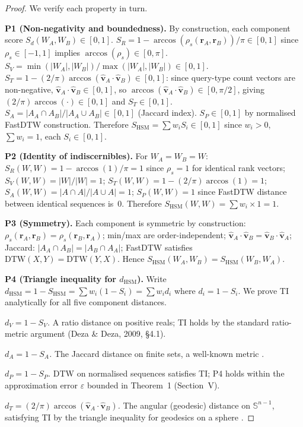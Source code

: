 \documentclass[10pt,twocolumn,a4paper]{article}
\newcommand{\SHSM}{S_{\mathrm{HSM}}}
\newcommand{\SR}{S_{R}}
\newcommand{\SV}{S_{V}}
\newcommand{\ST}{S_{T}}
\newcommand{\SA}{S_{A}}
\newcommand{\SPER}{S_{P}}
\newcommand{\dHSM}{d_{\mathrm{HSM}}}
\begin{document}
\begin{proof}
We verify each property in turn.

\textbf{P1 (Non-negativity and boundedness).}
By construction, each component score $S_d(W_A,W_B)\in[0,1]$.
$\SR=1-\arccos(\rho_s(\mathbf{r}_A,\mathbf{r}_B))/\pi\in[0,1]$
since $\rho_s\in[-1,1]$ implies $\arccos(\rho_s)\in[0,\pi]$.
$\SV=\min(|W_A|,|W_B|)/\max(|W_A|,|W_B|)\in[0,1]$.
$\ST=1-(2/\pi)\arccos(\hat{\mathbf{v}}_A\cdot\hat{\mathbf{v}}_B)\in[0,1]$:
since query-type count vectors are non-negative,
$\hat{\mathbf{v}}_A\cdot\hat{\mathbf{v}}_B\in[0,1]$, so
$\arccos(\hat{\mathbf{v}}_A\cdot\hat{\mathbf{v}}_B)\in[0,\pi/2]$,
giving $(2/\pi)\arccos(\cdot)\in[0,1]$ and $\ST\in[0,1]$.
$\SA=|A_A\cap A_B|/|A_A\cup A_B|\in[0,1]$ (Jaccard index).
$\SPER\in[0,1]$ by normalised FastDTW construction. Therefore
$\SHSM=\sum w_i S_i\in[0,1]$ since $w_i>0$, $\sum w_i=1$, each
$S_i\in[0,1]$.

\textbf{P2 (Identity of indiscernibles).}
For $W_A=W_B=W$: $\SR(W,W)=1-\arccos(1)/\pi=1$ since $\rho_s=1$ for
identical rank vectors; $\SV(W,W)=|W|/|W|=1$;
$\ST(W,W)=1-(2/\pi)\arccos(1)=1$;
$\SA(W,W)=|A\cap A|/|A\cup A|=1$;
$\SPER(W,W)=1$ since FastDTW distance between identical sequences is~0.
Therefore $\SHSM(W,W)=\sum w_i\times1=1$.

\textbf{P3 (Symmetry).}
Each component is symmetric by construction:
$\rho_s(\mathbf{r}_A,\mathbf{r}_B)=\rho_s(\mathbf{r}_B,\mathbf{r}_A)$;
min/max are order-independent;
$\hat{\mathbf{v}}_A\cdot\hat{\mathbf{v}}_B=\hat{\mathbf{v}}_B\cdot\hat{\mathbf{v}}_A$;
Jaccard: $|A_A\cap A_B|=|A_B\cap A_A|$;
FastDTW satisfies $\mathrm{DTW}(X,Y)=\mathrm{DTW}(Y,X)$.
Hence $\SHSM(W_A,W_B)=\SHSM(W_B,W_A)$.

\textbf{P4 (Triangle inequality for $\dHSM$).}
Write $\dHSM=1-\SHSM=\sum w_i(1-S_i)=\sum w_i d_i$ where $d_i=1-S_i$.
We prove TI analytically for all five component distances.

\emph{$d_V = 1-\SV$.} A ratio distance on positive reals; TI holds by
the standard ratio-metric argument (Deza \& Deza, 2009, \S4.1).

\emph{$d_A = 1-\SA$.} The Jaccard distance on finite sets, a
well-known metric \cite{Deza2009Distances}.

\emph{$d_P = 1-\SPER$.} DTW on normalised sequences satisfies TI;
P4 holds within the approximation error $\varepsilon$ bounded in
Theorem~1 (Section~V).

\emph{$d_T = (2/\pi)\arccos(\hat{\mathbf{v}}_A\cdot\hat{\mathbf{v}}_B)$.}
The angular (geodesic) distance on $\mathbb{S}^{n-1}$, satisfying TI
by the triangle inequality for geodesics on a sphere
\cite{Deza2009Distances}.


\end{proof}
\end{document}
